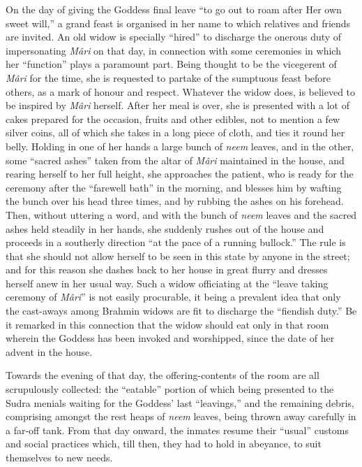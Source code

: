 \documentclass[a4paper, 12pt, oneside, english, twocolumn]{article}
\begin{document}
On the day of giving the Goddess final leave ``to go out to roam after Her own sweet will,'' a grand feast is organised in her name to which relatives and friends are invited. An old widow is specially ``hired'' to discharge the onerous duty of impersonating \emph{Mâri} on that day, in connection with some ceremonies in which her ``function'' plays a paramount part. Being thought to be the vicegerent of \emph{Mâri} for the time, she is requested to partake of the sumptuous feast before others, as a mark of honour and respect. Whatever the widow does, is believed to be inspired by \emph{Mâri} herself. After her meal is over, she is presented with a lot of cakes prepared for the occasion, fruits and other edibles, not to mention a few silver coins, all of which she takes in a long piece of cloth, and ties it round her belly. Holding in one of her hands a large bunch of \emph{neem} leaves, and in the other, some ``sacred ashes'' taken from the altar of \emph{Mâri} maintained in the house, and rearing herself to her full height, she approaches the patient, who is ready for the ceremony after the ``farewell bath'' in the morning, and blesses him by wafting the bunch over his head three times, and by rubbing the ashes on his forehead. Then, without uttering a word, and with the bunch of \emph{neem} leaves and the sacred ashes held steadily in her hands, she suddenly rushes out of the house and proceeds in a southerly direction ``at the pace of a running bullock.'' The rule is that she should not allow herself to be seen in this state by anyone in the street; and for this reason she dashes back to her house in great flurry and dresses herself anew in her usual way. Such a widow officiating at the ``leave taking ceremony of \emph{Mâri}'' is not easily procurable, it being a prevalent idea that only the cast-aways among Brahmin widows are fit to discharge the ``fiendish duty.'' Be it remarked in this connection that the widow should eat only in that room wherein the Goddess has been invoked and worshipped, since the date of her advent in the house.

Towards the evening of that day, the offering-contents of the room are all scrupulously collected: the ``eatable'' portion of which being presented to the Sudra menials waiting for the Goddess' last ``leavings,'' and the remaining debris, comprising amongst the rest heaps of \emph{neem} leaves, being thrown away carefully in a far-off tank. From that day onward, the inmates resume their ``usual'' customs and social practices which, till then, they had to hold in abeyance, to suit themselves to new needs.
\end{document}
